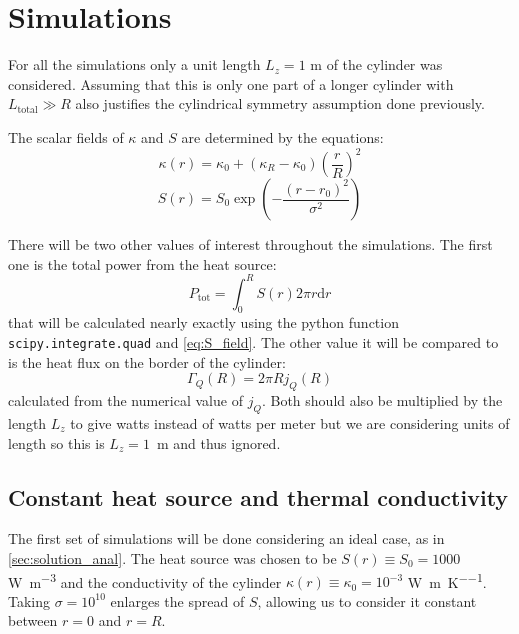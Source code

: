 \section{Simulations}

For all the simulations only a unit length $L_z = 1$ \si{\meter} of the cylinder was considered. Assuming that this is only one part of a longer cylinder with $L_\mathrm{total} \gg R$ also justifies the cylindrical symmetry assumption done previously.

The scalar fields of $\kappa$ and $S$ are determined by the equations:
\begin{equation}
    \kappa(r) = \kappa_0 + (\kappa_R - \kappa_0)\left(\frac{r}{R}\right)^2
    \label{eq:kappa_field}
\end{equation}
\begin{equation}
    S(r) = S_0\exp\left(-\frac{(r-r_0)^2}{\sigma^2}\right)
    \label{eq:S_field}
\end{equation}

There will be two other values of interest throughout the simulations. The first one is the total power from the heat source:
\begin{equation}
    P_\mathrm{tot} = \int_0^R S(r)2\pi r \mathrm{d}r
    \label{eq:ptot_source}
\end{equation}
that will be calculated nearly exactly using the python function \texttt{scipy.integrate.quad} and \autoref{eq:S_field}. The other value it will be compared to is the heat flux on the border of the cylinder:
\begin{equation}
    \Gamma_Q(R) = 2\pi Rj_Q(R)
    \label{eq:flux_border}
\end{equation}
calculated from the numerical value of $j_Q$. Both should also be multiplied by the length $L_z$ to give watts instead of watts per meter but we are considering units of length so this is \mbox{$L_z = 1$ \si{\meter}} and thus ignored.

\subsection{Constant heat source and thermal conductivity}
\label{sec:simu_constant}

The first set of simulations will be done considering an ideal case, as in \autoref{sec:solution_anal}. The heat source was chosen to be \(S(r) \equiv S_0 = 1000\) \si{\watt\per\cubic\meter} and the conductivity of the cylinder \(\kappa(r) \equiv \kappa_0 = 10^{-3}\) \si{\watt\per\meter\per\kelvin}. Taking \(\sigma = 10^{10}\) enlarges the spread of \(S\), allowing us to consider it constant between \(r=0\) and \(r=R\).

